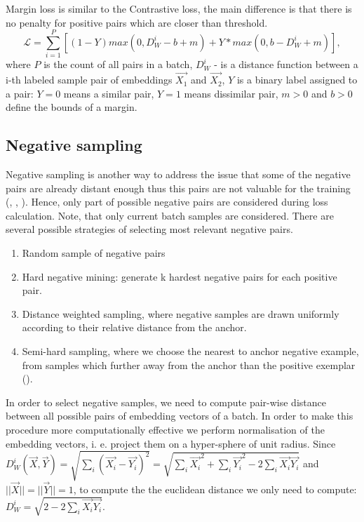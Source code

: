 \documentclass[sigconf, anonymous]{acmart}
\begin{document}
Margin loss is similar to the Contrastive loss, the main difference is that there is no penalty for positive pairs which are closer than threshold.
\begin{equation}
 \mathcal{L} = \sum_{i=1}^P \left[ (1-Y)max(0, D_W^i - b + m) + Y*max(0, b-D_W^i + m) \right],
\end{equation}
where $P$ is the count of all pairs in a batch, $D_W^i$ - is a distance function between a i-th labeled sample pair of embeddings $\vec{X_1}$ and $\vec{X_2}$,
$Y$ is a binary label assigned to a pair: $Y = 0$ means a similar pair, $Y = 1$ means dissimilar pair, $m > 0$ and $b > 0$ define the bounds of a margin.

\subsection{Negative sampling} \label{sec-neg-samples}

Negative sampling is another way to address the issue that some of the negative pairs are already distant enough thus this pairs are not valuable for the training (\cite{simo2015discriminative}, \cite{wu2017sampling}, \cite{Schroff2015FaceNetAU}). Hence, only part of possible negative pairs are considered during loss calculation. Note, that only current batch samples are considered. There are several possible strategies of selecting most relevant negative pairs.

\begin{enumerate}
    \item Random sample of negative pairs
    \item Hard negative mining: generate k hardest negative pairs for each positive pair.
    \item Distance weighted sampling, where negative samples are drawn uniformly according to their relative distance from the anchor. \cite{wu2017sampling}
    \item Semi-hard sampling, where we choose the nearest to anchor negative example, from samples which further away from the anchor than the positive exemplar (\cite{Schroff2015FaceNetAU}).
\end{enumerate}

In order to select negative samples, we need to compute pair-wise distance between all possible pairs of embedding vectors of a batch. In order to make this procedure more computationally effective we perform normalisation of the embedding vectors, i. e. project them on a hyper-sphere of unit radius. Since $D_W^i(\vec{X},\vec{Y}) = \sqrt{\sum_i(\vec{X_i} - \vec{Y_i})^2} = \sqrt{\sum_i\vec{X_i}^2 + \sum_i\vec{Y_i}^2 - 2\sum_i\vec{X_i}\vec{Y_i}} $ and $||\vec{X}||= ||\vec{Y}||=1$, to compute the the euclidean distance we only need to compute: $D_W^i = \sqrt{2 - 2\sum_i\vec{X_i}\vec{Y_i}}$.
\end{document}
